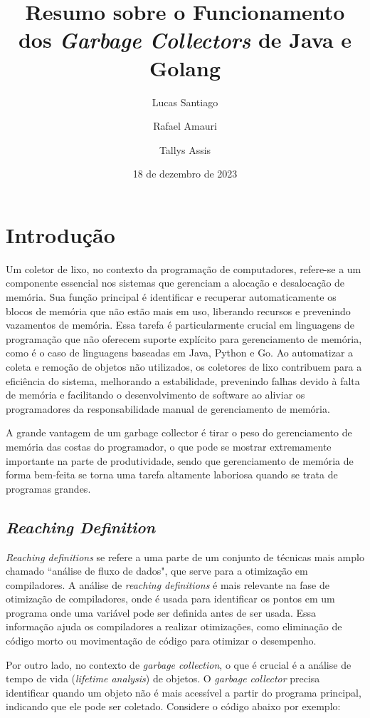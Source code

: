 \documentclass{article}
\title{Resumo sobre o Funcionamento dos \emph{Garbage Collectors} de Java e Golang}
\author{Lucas Santiago \and Rafael Amauri \and Tallys Assis}
\date{18 de dezembro de 2023}
\begin{document}
    \maketitle

    \section*{Introdução}

    Um coletor de lixo, no contexto da programação de computadores, refere-se a um componente essencial nos sistemas que gerenciam a
    alocação e desalocação de memória. Sua função principal é identificar e recuperar automaticamente os blocos de memória que
    não estão mais em uso, liberando recursos e prevenindo vazamentos de memória. Essa tarefa é particularmente crucial em
    linguagens de programação que não oferecem suporte explícito para gerenciamento de memória, como é o caso de linguagens
    baseadas em Java, Python e Go. Ao automatizar a coleta e remoção de objetos não utilizados, os coletores de lixo contribuem
    para a eficiência do sistema, melhorando a estabilidade, prevenindo falhas devido à falta de memória e facilitando o desenvolvimento
    de software ao aliviar os programadores da responsabilidade manual de gerenciamento de memória.

    A grande vantagem de um garbage collector é tirar o peso do gerenciamento de memória das costas do programador,
    o que pode se mostrar extremamente importante na parte de produtividade, sendo que gerenciamento de memória de forma bem-feita
    se torna uma tarefa altamente laboriosa quando se trata de programas grandes.

    \subsection*{\emph{Reaching Definition}}
    \emph{Reaching definitions} se refere a uma parte de um conjunto de técnicas mais amplo chamado ``análise de fluxo de dados",
    que serve para a otimização em compiladores. A análise de \emph{reaching definitions} é mais relevante na fase de otimização
    de compiladores, onde é usada para identificar os pontos em um programa onde uma variável pode ser definida antes de ser usada.
    Essa informação ajuda os compiladores a realizar otimizações, como eliminação de código morto ou movimentação de código para otimizar o desempenho.

    Por outro lado, no contexto de \emph{garbage collection}, o que é crucial é a análise de tempo de vida (\emph{lifetime analysis}) de objetos.
    O \emph{garbage collector} precisa identificar quando um objeto não é mais acessível a partir do programa principal, indicando que ele pode ser coletado.
    Considere o código abaixo por exemplo:
\end{document}
